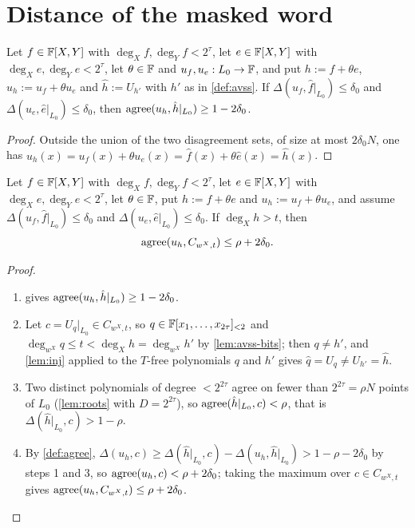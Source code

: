 \section{Distance of the masked word}

\begin{lemma}\label{lem:avss-close}
Let $f\in\mathbb{F}[X,Y]$ with $\deg_Xf,\deg_Yf<2^\tau$, let $e\in\mathbb{F}[X,Y]$ with $\deg_Xe,\deg_Ye<2^\tau$,
let $\theta\in\mathbb{F}$ and $u_f,u_e:L_0\to\mathbb{F}$, and put $h:=f+\theta e$, $u_h:=u_f+\theta u_e$ and $\hat h:=U_{h'}$ with $h'$ as in
\cref{def:avss}. If $\Delta(u_f,\hat f|_{L_0})\le\delta_0$ and
$\Delta(u_e,\hat e|_{L_0})\le\delta_0$, then $\mathrm{agree}(u_h,\hat h|_{L_0})\ge1-2\delta_0$.
\end{lemma}

\begin{proof}
Outside the union of the two disagreement sets, of size at most $2\delta_0N$, one has
$u_h(x)=u_f(x)+\theta u_e(x)=\hat f(x)+\theta\hat e(x)=\hat h(x)$.
\end{proof}

\begin{lemma}\label{lem:avss-dist}
Let $f\in\mathbb{F}[X,Y]$ with $\deg_Xf,\deg_Yf<2^\tau$, let $e\in\mathbb{F}[X,Y]$ with $\deg_Xe,\deg_Ye<2^\tau$, let $\theta\in\mathbb{F}$, put
$h:=f+\theta e$ and $u_h:=u_f+\theta u_e$, and assume
$\Delta(u_f,\hat f|_{L_0})\le\delta_0$ and $\Delta(u_e,\hat e|_{L_0})\le\delta_0$. If
$\deg_Xh>t$, then
\[
\mathrm{agree}(u_h,C_{w^X,t})\le\rho+2\delta_0 .
\]
\end{lemma}

\begin{proof}\begin{enumerate}
\item {} gives $\mathrm{agree}(u_h,\hat h|_{L_0})\ge1-2\delta_0$.
\item Let $c=U_q|_{L_0}\in C_{w^X,t}$, so $q\in\mathbb{F}[x_1,\dots,x_{2\tau}]_{<2}$ and
$\deg_{w^X}q\le t<\deg_Xh=\deg_{w^X}h'$ by \cref{lem:avss-bits}; then $q\ne h'$, and
\cref{lem:inj} applied to the $T$-free polynomials $q$ and $h'$ gives
$\hat q=U_q\ne U_{h'}=\hat h$.
\item Two distinct polynomials of degree $<2^{2\tau}$ agree on fewer than $2^{2\tau}=\rho N$
points of $L_0$ (\cref{lem:roots} with $D=2^{2\tau}$), so
$\mathrm{agree}(\hat h|_{L_0},c)<\rho$, that is $\Delta(\hat h|_{L_0},c)>1-\rho$.
\item By \cref{def:agree}, $\Delta(u_h,c)\ge\Delta(\hat h|_{L_0},c)-\Delta(u_h,\hat h|_{L_0})
>1-\rho-2\delta_0$ by steps 1 and 3, so $\mathrm{agree}(u_h,c)<\rho+2\delta_0$; taking the maximum over
$c\in C_{w^X,t}$ gives $\mathrm{agree}(u_h,C_{w^X,t})\le\rho+2\delta_0$.
\end{enumerate}\end{proof}
